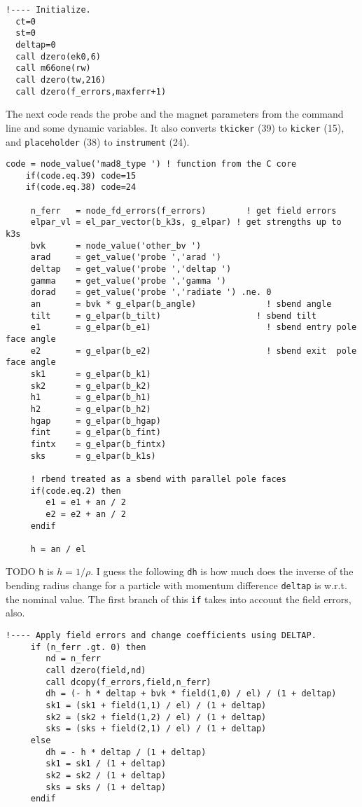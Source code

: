 \documentclass{cern-art} %
\renewcommand{\L}[1]{\lstinline[firstnumber=last]{#1}}
\begin{document}
\begin{lstlisting}[firstnumber=last]
  !---- Initialize.
  ct=0
  st=0
  deltap=0
  call dzero(ek0,6)
  call m66one(rw)
  call dzero(tw,216)
  call dzero(f_errors,maxferr+1)
\end{lstlisting}
The next code reads the probe and the magnet parameters from the command line and some dynamic variables. It also converts \L{tkicker} (39) to \L{kicker} (15), and \L{placeholder} (38) to \L{instrument} (24).
\begin{lstlisting}[firstnumber=last]
    code = node_value('mad8_type ') ! function from the C core
    if(code.eq.39) code=15
    if(code.eq.38) code=24

     n_ferr   = node_fd_errors(f_errors)        ! get field errors
     elpar_vl = el_par_vector(b_k3s, g_elpar) ! get strengths up to k3s
     bvk      = node_value('other_bv ')
     arad     = get_value('probe ','arad ')
     deltap   = get_value('probe ','deltap ')
     gamma    = get_value('probe ','gamma ')
     dorad    = get_value('probe ','radiate ') .ne. 0
     an       = bvk * g_elpar(b_angle)              ! sbend angle
     tilt     = g_elpar(b_tilt)                   ! sbend tilt
     e1       = g_elpar(b_e1)                       ! sbend entry pole face angle
     e2       = g_elpar(b_e2)                       ! sbend exit  pole face angle
     sk1      = g_elpar(b_k1)
     sk2      = g_elpar(b_k2)
     h1       = g_elpar(b_h1)
     h2       = g_elpar(b_h2)
     hgap     = g_elpar(b_hgap)
     fint     = g_elpar(b_fint)
     fintx    = g_elpar(b_fintx)
     sks      = g_elpar(b_k1s)

     ! rbend treated as a sbend with parallel pole faces
     if(code.eq.2) then
        e1 = e1 + an / 2
        e2 = e2 + an / 2
     endif

     h = an / el
\end{lstlisting}
TODO \L{h} is $h=1/\rho$. I guess the following \L{dh} is how much does the inverse of the bending radius change for a particle with momentum difference \L{deltap} is w.r.t. the nominal value. The first branch of this \L{if} takes into account the field errors, also.
  \begin{lstlisting}[firstnumber=last]
     !---- Apply field errors and change coefficients using DELTAP.
     if (n_ferr .gt. 0) then
        nd = n_ferr
        call dzero(field,nd)
        call dcopy(f_errors,field,n_ferr)
        dh = (- h * deltap + bvk * field(1,0) / el) / (1 + deltap)
        sk1 = (sk1 + field(1,1) / el) / (1 + deltap)
        sk2 = (sk2 + field(1,2) / el) / (1 + deltap)
        sks = (sks + field(2,1) / el) / (1 + deltap)
     else
        dh = - h * deltap / (1 + deltap)
        sk1 = sk1 / (1 + deltap)
        sk2 = sk2 / (1 + deltap)
        sks = sks / (1 + deltap)
     endif
  \end{lstlisting}
\end{document}
